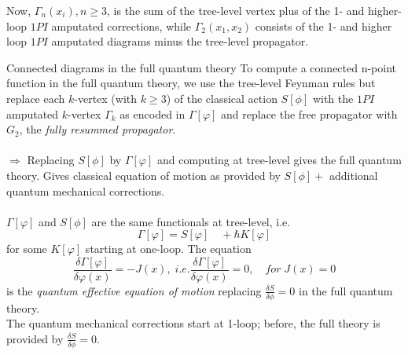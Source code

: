 Now, $\Gamma_n(x_i), n\geq 3$, is the sum of the tree-level vertex plus of the 1- and higher-loop $1PI$ amputated corrections, while $\Gamma_2(x_1,x_2)$ consists of the 1- and higher loop $1PI$ amputated diagrams minus the tree-level propagator.\\
 \begin{mybox}{Connected diagrams in the full quantum theory}
 	To compute a connected n-point function in the full quantum theory, we use the tree-level Feynman rules but replace each $k$-vertex (with $k\geq 3$) of the classical action $S[\phi]$ with the $1PI$ amputated $k$-vertex $\Gamma_k$ as encoded in $\Gamma[\varphi]$ and replace the free propagator with $G_2$, the \emph{fully resummed propagator}.\\
 	\\
 	$\Rightarrow$ Replacing $S[\phi]$ by $\Gamma[\varphi]$ and computing at tree-level gives the full quantum theory. Gives classical equation of motion as provided by $S[\phi] +$ additional quantum mechanical corrections.\\
 	\\
 	$\Gamma[\varphi]$ and $S[\phi]$ are the same functionals at tree-level, i.e. 
 	\begin{equation}
 		\Gamma[\varphi] = S[\varphi] \quad + \hbar K[\varphi] 
 	\end{equation}
 	for some $K[\varphi]$ starting at one-loop. The equation
 	\begin{equation}
 		\frac{\delta \Gamma [\varphi]}{\delta \varphi(x)} = - J(x), \; i.e. \frac{\delta \Gamma[\varphi]}{\delta \varphi(x)} = 0, \quad for \; J(x) =0
 	\end{equation}
 	is the \emph{quantum effective equation of motion} replacing $\frac{\delta S}{\delta \phi}=0$ in the full quantum theory.\\
 	The quantum mechanical corrections start at 1-loop; before, the full theory is provided by $\frac{\delta S}{\delta \phi}=0$.
 \end{mybox}


